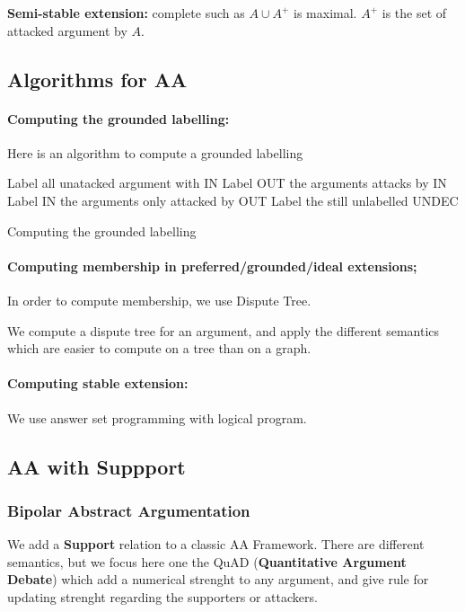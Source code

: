 		\begin{definition}
			\textbf{Semi-stable extension:} complete such as $A\cup A^+$ is maximal. $A^+$ is the set of attacked argument by $A$.
		\end{definition}


	\subsection{Algorithms for AA}

		\paragraph{Computing the grounded labelling:}
		Here is an algorithm to compute a grounded labelling\\
		\begin{algorithm}[H]
		Label all unatacked argument with IN \;
		{
			Label OUT the arguments attacks by IN \;
			Label IN the arguments only attacked by OUT\;
		}
		Label the still unlabelled UNDEC\;
		\caption{Computing the grounded labelling}
		\end{algorithm}

		\paragraph{Computing membership in preferred/grounded/ideal extensions;} In order to compute membership, we use Dispute Tree.

		We compute a dispute tree for an argument, and apply the different semantics which are easier to compute on a tree than on a graph.

		\paragraph{Computing stable extension:} We use answer set programming with logical program. 
		

	\subsection{AA with Suppport}

		\subsubsection[BAA]{Bipolar Abstract Argumentation}
			We add a \textbf{Support} relation to a classic AA Framework. There are different semantics, but we focus here one the QuAD (\textbf{Quantitative Argument Debate}) which add a numerical strenght to any argument, and give rule for updating strenght regarding the supporters or attackers.


